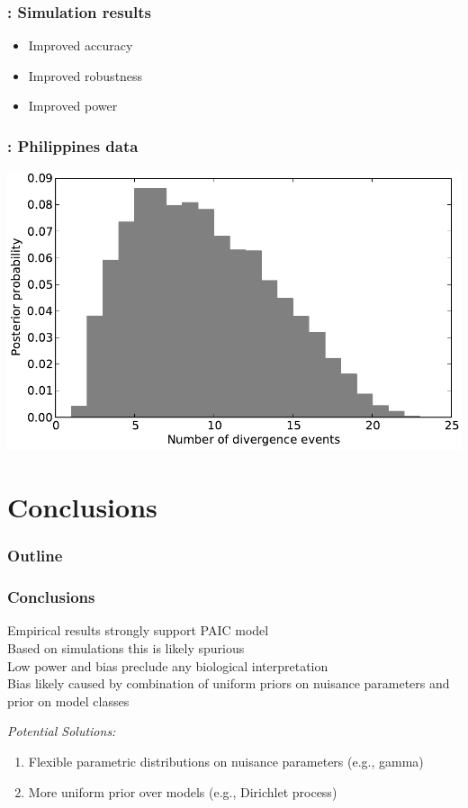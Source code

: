 \begin{frame}
    \frametitle{\dppmsbayes: Simulation results}
    \begin{itemize}
        \item Improved accuracy
        \item Improved robustness
        \item Improved power
    \end{itemize}
\end{frame}

\begin{frame}
    \frametitle{\dppmsbayes: Philippines data}
    \includegraphics[width=\textwidth]{../empirical-analyses/plots/philippines-dpp-psi-posterior.pdf}
\end{frame}

\section{Conclusions}

\begin{frame}
\frametitle{Outline}
\end{frame}

\begin{frame}
    \frametitle{Conclusions}
    Empirical results strongly support PAIC model \\
    \bigskip
    Based on simulations this is likely spurious \\
    \bigskip
    Low power and bias preclude any biological interpretation \\
    \bigskip
    Bias likely caused by combination of uniform priors on nuisance parameters
    and prior on model classes \\
    \bigskip
    \begin{block}{\it Potential Solutions:}
        \begin{enumerate}
            \item Flexible parametric distributions on nuisance parameters (e.g., gamma)
            \item More uniform prior over models (e.g., Dirichlet process)
        \end{enumerate}
    \end{block}
\end{frame}

